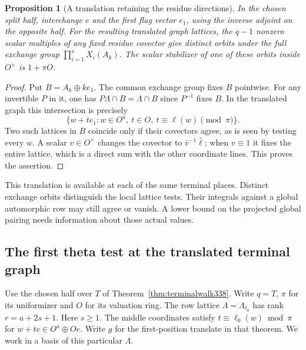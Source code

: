 \documentclass[a4paper,11pt]{article}
\newtheorem{proposition}{Proposition}[section]
\theoremstyle{definition}
\theoremstyle{remark}
\numberwithin{equation}{section}
\begin{document}
\begin{proposition}[A translation retaining the residue directions]\label{prop:firstcolumn337}
In the chosen split half, interchange \(e\) and the first flag
vector \(e_1\), using the inverse adjoint on the opposite half.
For the resulting translated graph lattices, the
\(q-1\) nonzero scalar multiples of any fixed residue covector
give distinct orbits under the full exchange group
\(\prod_{i=1}^s X_i(A_k)\). The scalar stabilizer of one of
these orbits inside \(O^\times\) is \(1+\pi O\).
\end{proposition}
\begin{proof}
Put \(B=A_k\oplus ke_1\). The common exchange group fixes \(B\)
pointwise. For any invertible \(P\) in it, one has
\(P\Lambda\cap B=\Lambda\cap B\) since \(P^{-1}\) fixes \(B\).
In the translated graph this intersection is precisely
\[
     \{w+t e_1:w\in O^a,\ t\in O,\ t\equiv\ell(w)\pmod\pi\}.
\]
Two such lattices in \(B\) coincide only if their covectors agree,
as is seen by testing every \(w\). A scalar \(v\in O^\times\)
changes the covector to \(\bar v^{-1}\bar\ell\); when \(v\equiv1\)
it fixes the entire lattice, which is a direct sum with the other
coordinate lines. This proves the assertion.
\end{proof}

This translation is available at each of the same terminal places.
Distinct exchange orbits distinguish the local lattice tests.
Their integrals against a global automorphic row may still agree
or vanish. A lower bound on the projected global pairing needs
information about those actual values.


\subsection{The first theta test at the translated terminal graph}\label{sec:pintable340}
Use the chosen half over $T$ of Theorem~\ref{thm:terminalwalk338}.
Write $q=T$, $\pi$ for its uniformizer and $O$ for its valuation ring.
The row lattice $\Lambda=\Lambda_{\ell_0}$ has rank $r=a+2s+1$.
Here $s\ge1$. The middle coordinates satisfy $t\equiv\ell_0(w)\bmod\pi$ for
$w+te\in O^a\oplus Oe$. Write $g$ for the first-position translate
in that theorem. We work in a basis of this particular $\Lambda$.
\end{document}
